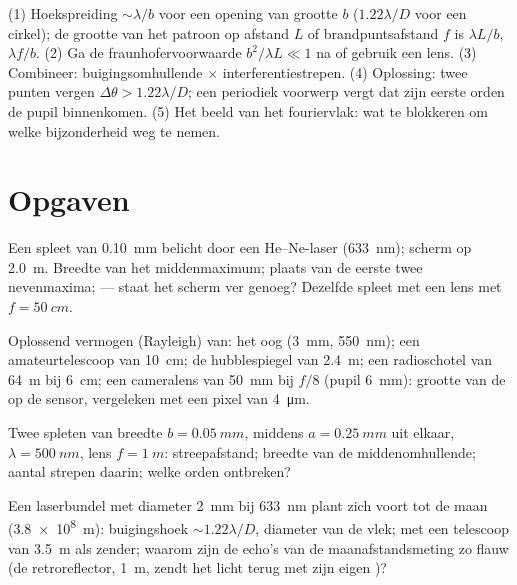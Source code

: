 \begin{method}[Buigingsschattingen]\label{met:b2:diffraction:method}
(1) Hoekspreiding $\sim\lambda/b$ voor een opening van grootte $b$
($1.22\lambda/D$ voor
een cirkel); de grootte van het patroon op afstand $L$ of brandpuntsafstand $f$ is
$\lambda L/b$, $\lambda f/b$. (2) Ga de fraunhofervoorwaarde
$b^2/\lambda L \ll 1$ na of
gebruik een lens. (3) Combineer: buigingsomhullende $\times$ interferentie\-strepen.
(4) Oplossing: twee punten vergen $\Delta\theta > 1.22\lambda/D$; een periodiek
voorwerp vergt dat zijn eerste orden de pupil binnenkomen. (5) Het beeld van het
fouriervlak: wat te blokkeren om welke bijzonderheid weg te nemen.
\end{method}

\section{Opgaven}

\begin{exercise}[$\star$]\label{exo:b2:diffraction:1}
Een spleet van \qty{0.10}{mm} belicht door een He--Ne-laser (\qty{633}{nm});
scherm op
\qty{2.0}{m}. Breedte van het middenmaximum; plaats van de eerste twee
nevenmaxima;  --- staat het scherm ver genoeg? Dezelfde
spleet met een lens met $f = \qty{50}{cm}$.
\end{exercise}

\begin{exercise}[$\star$]\label{exo:b2:diffraction:2}
Oplossend vermogen (Rayleigh) van: het oog (\qty{3}{mm}, \qty{550}{nm}); een
amateurtelescoop van \qty{10}{cm}; de hubblespiegel van \qty{2.4}{m}; een
radioschotel van \qty{64}{m}
bij \qty{6}{cm}; een cameralens van \qty{50}{mm} bij $f/8$ (pupil \qty{6}{mm}):
grootte van de  op de sensor, vergeleken met een pixel van
\qty{4}{\micro m}.
\end{exercise}

\begin{exercise}[$\star$]\label{exo:b2:diffraction:3}
Twee spleten van breedte $b = \qty{0.05}{mm}$, middens $a = \qty{0.25}{mm}$
uit elkaar, $\lambda =
\qty{500}{nm}$, lens $f = \qty{1}{m}$: streepafstand;
breedte van de
middenomhullende; aantal strepen daarin; welke orden ontbreken?
\end{exercise}

\begin{exercise}[$\star$]\label{exo:b2:diffraction:4}
Een laserbundel met diameter \qty{2}{mm} bij \qty{633}{nm} plant zich voort
tot de maan
(\qty{3.8e8}{m}): buigingshoek $\sim1.22\lambda/D$, diameter van de vlek;
met een telescoop van \qty{3.5}{m} als zender; waarom zijn de echo's van de
maanafstandsmeting zo flauw (de retroreflector, \qty{1}{m}, zendt het licht
terug met zijn eigen
)?
\end{exercise}

